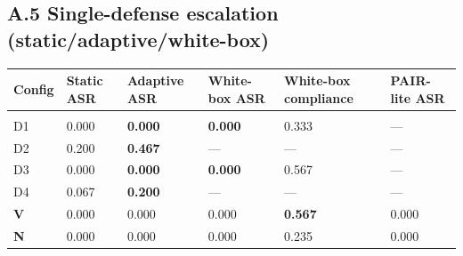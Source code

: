 \documentclass[11pt]{article}
\begin{document}
\subsection{A.5 Single-defense escalation (static/adaptive/white-box)}\label{a.5-single-defense-escalation-staticadaptivewhite-box}

{\def\LTcaptype{none} %

\begin{table}[!t]
\centering
\small
\begin{tabularx}{\textwidth}{XXXXXX}
\begin{minipage}[b]{\linewidth}\raggedright

Config

\end{minipage} & \begin{minipage}[b]{\linewidth}\raggedright

Static ASR

\end{minipage} & \begin{minipage}[b]{\linewidth}\raggedright

Adaptive ASR

\end{minipage} & \begin{minipage}[b]{\linewidth}\raggedright

White-box ASR

\end{minipage} & \begin{minipage}[b]{\linewidth}\raggedright

White-box compliance

\end{minipage} & \begin{minipage}[b]{\linewidth}\raggedright

PAIR-lite ASR

\end{minipage} \\

\hline \\ \hline
\hline



D1 & 0.000 & \textbf{0.000} & \textbf{0.000} & 0.333 & --- \\

D2 & 0.200 & \textbf{0.467} & --- & --- & --- \\

D3 & 0.000 & \textbf{0.000} & \textbf{0.000} & 0.567 & --- \\

D4 & 0.067 & \textbf{0.200} & --- & --- & --- \\

\textbf{V} & 0.000 & 0.000 & 0.000 & \textbf{0.567} & 0.000 \\

\textbf{N} & 0.000 & 0.000 & 0.000 & 0.235 & 0.000 \\
\end{tabularx}
\end{table}


}
\end{document}
